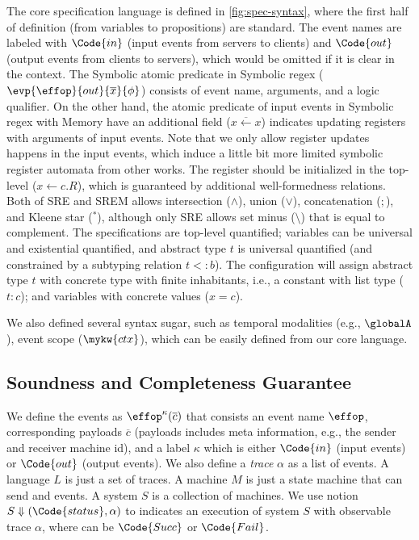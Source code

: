 The core specification language is defined in \autoref{fig:spec-syntax}, where the first half of definition (from variables to propositions) are standard. The event names are labeled with $\Code{in}$ (input events from servers to clients) and $\Code{out}$ (output events from clients to servers), which would be omitted if it is clear in the context. The Symbolic atomic predicate in Symbolic regex ($\evp{\effop}{out}{\overline{x}}{\phi}$) consists of event name, arguments, and a logic qualifier. On the other hand, the atomic predicate of input events in Symbolic regex with Memory have an additional field ($\overline{x \leftarrow x}$) indicates updating registers with arguments of input events. Note that we only allow register updates happens in the input events, which induce a little bit more limited symbolic register automata from other works. The register should be initialized in the top-level ($x \leftarrow c. R$), which is guaranteed by additional well-formedness relations. Both of SRE and SREM allows intersection ($\land$), union ($\lor$), concatenation ($;$), and Kleene star ($^*$), although only SRE allows set minus ($\setminus$) that is equal to complement. The specifications are top-level quantified; variables can be universal and existential quantified, and abstract type $t$ is universal quantified (and constrained by a subtyping relation $t <: b$). The configuration will assign abstract type $t$ with concrete type with finite inhabitants, i.e., a constant with list type ($t:c$); and variables with concrete values ($x = c$).

We also defined several syntax sugar, such as temporal modalities (e.g., $\globalA$), event scope ($\mykw{ctx}$), which can be easily defined from our core language.

\newpage

\subsection{Soundness and Completeness Guarantee}

We define the events as $\effop^\kappa(\overline{c})$ that consists an event name $\effop$, corresponding payloads $\overline{c}$ (payloads includes meta information, e.g., the sender and receiver machine id), and a label $\kappa$ which is either $\Code{in}$ (input events) or $\Code{out}$ (output events). We also define a \emph{trace} $\alpha$ as a list of events. A language $L$ is just a set of traces. A machine $M$ is just a state machine that can send and events. A system $S$ is a collection of machines. We use notion $S \Downarrow (\Code{status}, \alpha)$ to indicates an execution of system $S$ with observable trace $\alpha$, where  can be $\Code{Succ}$ or $\Code{Fail}$.

